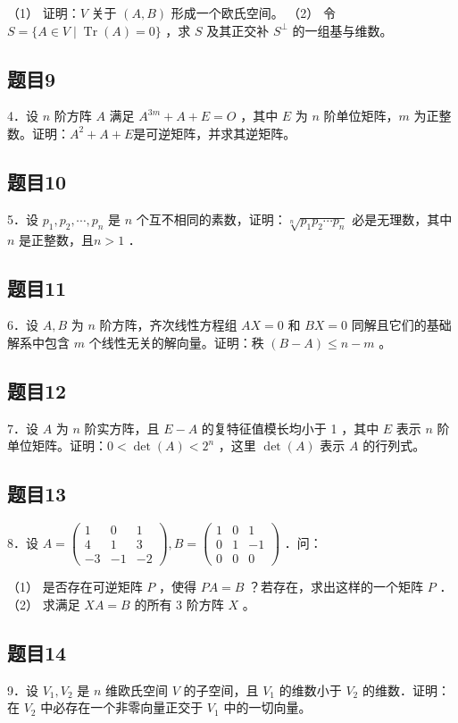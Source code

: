 \documentclass{article}
\begin{document}
（1） 证明：\(V\) 关于 \((A, B)\) 形成一个欧氏空间。
（2） 令 \(S=\{A \in V \mid \operatorname{Tr}(A)=0\}\) ，求 \(S\) 及其正交补 \(S^{\perp}\) 的一组基与维数。

\subsection{题目9}
4．设 \(n\) 阶方阵 \(A\) 满足 \(A^{3 m}+A+E=O\) ，其中 \(E\) 为 \(n\) 阶单位矩阵，\(m\) 为正整数。证明：\(A^{2}+A+E\)是可逆矩阵，并求其逆矩阵。

\subsection{题目10}
5．设 \(p_{1}, p_{2}, \cdots, p_{n}\) 是 \(n\) 个互不相同的素数，证明：\(\sqrt[n]{p_{1} p_{2} \cdots p_{n}}\) 必是无理数，其中 \(n\) 是正整数，且\(n>1\) ．

\subsection{题目11}
6．设 \(A, B\) 为 \(n\) 阶方阵，齐次线性方程组 \(A X=0\) 和 \(B X=0\) 同解且它们的基础解系中包含 \(m\) 个线性无关的解向量。证明：秩 \((B-A) \leq n-m\) 。

\subsection{题目12}
7．设 \(A\) 为 \(n\) 阶实方阵，且 \(E-A\) 的复特征值模长均小于 1 ，其中 \(E\) 表示 \(n\) 阶单位矩阵。证明：\(0<\operatorname{det}(A)<2^{n}\) ，这里 \(\operatorname{det}(A)\) 表示 \(A\) 的行列式。

\subsection{题目13}
8．设 \(A=\left(\begin{array}{ccc}1 & 0 & 1 \\ 4 & 1 & 3 \\ -3 & -1 & -2\end{array}\right), B=\left(\begin{array}{ccc}1 & 0 & 1 \\ 0 & 1 & -1 \\ 0 & 0 & 0\end{array}\right)\) ．问：

（1） 是否存在可逆矩阵 \(P\) ，使得 \(P A=B\) ？若存在，求出这样的一个矩阵 \(P\) ．
（2） 求满足 \(X A=B\) 的所有 3 阶方阵 \(X\) 。

\subsection{题目14}
9．设 \(V_{1}, V_{2}\) 是 \(n\) 维欧氏空间 \(V\) 的子空间，且 \(V_{1}\) 的维数小于 \(V_{2}\) 的维数．证明：在 \(V_{2}\) 中必存在一个非零向量正交于 \(V_{1}\) 中的一切向量。
\end{document}
